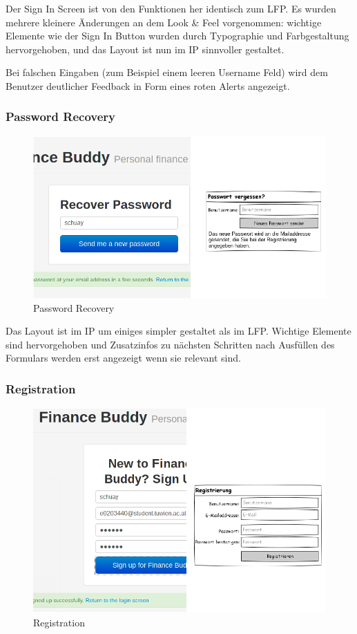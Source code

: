 \documentclass[a4paper,10pt]{article}
\begin{document}
Der Sign In Screen ist von den Funktionen her identisch zum LFP. Es wurden mehrere
kleinere \"Anderungen an dem Look \& Feel vorgenommen: wichtige Elemente wie der
Sign In Button wurden durch Typographie und Farbgestaltung hervorgehoben, und das Layout
ist nun im IP sinnvoller gestaltet.

Bei falschen Eingaben (zum Beispiel einem leeren Username Feld) wird dem Benutzer
deutlicher Feedback in Form eines roten Alerts angezeigt.

\clearpage
\subsubsection{Password Recovery}

\begin{figure}
\centering
\includegraphics[width=\textwidth]{password-recovery}
\caption{Password Recovery} \label{fig:password-recovery}
\end{figure}

Das Layout ist im IP um einiges simpler gestaltet als im LFP. Wichtige Elemente
sind hervorgehoben und Zusatzinfos zu n\"achsten Schritten nach Ausf\"ullen
des Formulars werden erst angezeigt wenn sie relevant sind.

\clearpage
\subsubsection{Registration}

\begin{figure}
\centering
\includegraphics[width=\textwidth]{registration}
\caption{Registration} \label{fig:registration}
\end{figure}
\end{document}
